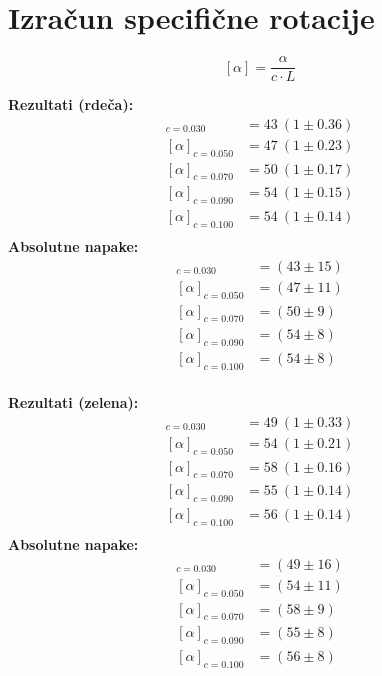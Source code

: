 \documentclass[a4paper,12pt]{article}
\begin{document}
\section*{Izračun specifične rotacije}
\[
[\alpha] = \frac{\alpha}{c \cdot L}
\]
\begin{minipage}{0.48\textwidth}
\textbf{Rezultati (rdeča):}
\begin{align*}
[\alpha]_{c=0.030} &= 43 \ (1 \pm 0.36) \\
[\alpha]_{c=0.050} &= 47 \ (1 \pm 0.23) \\
[\alpha]_{c=0.070} &= 50 \ (1 \pm 0.17) \\
[\alpha]_{c=0.090} &= 54 \ (1 \pm 0.15) \\
[\alpha]_{c=0.100} &= 54 \ (1 \pm 0.14) \\
\end{align*}
\textbf{Absolutne napake:}
\begin{align*}
[\alpha]_{c=0.030} &= (43 \pm 15) \\
[\alpha]_{c=0.050} &= (47 \pm 11) \\
[\alpha]_{c=0.070} &= (50 \pm 9) \\
[\alpha]_{c=0.090} &= (54 \pm 8) \\
[\alpha]_{c=0.100} &= (54 \pm 8) \\
\end{align*}
\end{minipage}
\hfill
\begin{minipage}{0.48\textwidth}
\textbf{Rezultati (zelena):}
\begin{align*}
[\alpha]_{c=0.030} &= 49 \ (1 \pm 0.33) \\
[\alpha]_{c=0.050} &= 54 \ (1 \pm 0.21) \\
[\alpha]_{c=0.070} &= 58 \ (1 \pm 0.16) \\
[\alpha]_{c=0.090} &= 55 \ (1 \pm 0.14) \\
[\alpha]_{c=0.100} &= 56 \ (1 \pm 0.14) \\
\end{align*}
\textbf{Absolutne napake:}
\begin{align*}
[\alpha]_{c=0.030} &= (49 \pm 16) \\
[\alpha]_{c=0.050} &= (54 \pm 11) \\
[\alpha]_{c=0.070} &= (58 \pm 9) \\
[\alpha]_{c=0.090} &= (55 \pm 8) \\
[\alpha]_{c=0.100} &= (56 \pm 8) \\
\end{align*}
\end{minipage}
\end{document}
